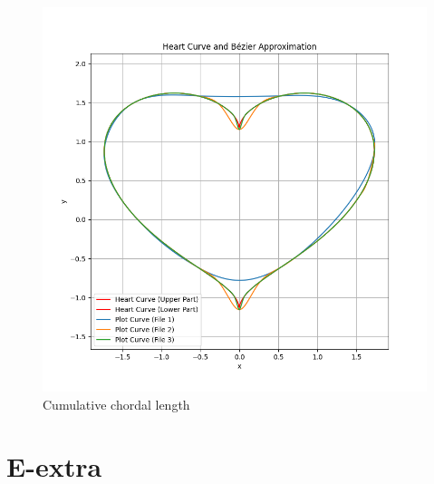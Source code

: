 \documentclass[a4paper]{article}
\begin{document}
\begin{figure}[h]
\begin{minipage}{0.45\textwidth}
        \includegraphics[width=\linewidth]{../figure/E_CCL.png}
        \caption{Cumulative chordal length}
    \end{minipage}
\end{figure}

\section{E-extra}
\end{document}
